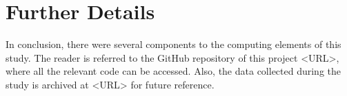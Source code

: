 \section{Further Details}
In conclusion, there were several components to the computing elements of this
study. The reader is referred to the GitHub repository of this project <URL>,
where all the relevant code can be accessed. Also, the data collected during the
study is archived at <URL> for future reference.